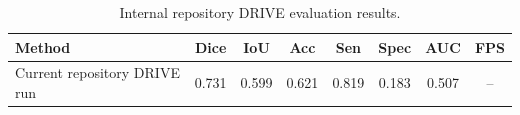 \documentclass{article}
\begin{document}
\begin{table}[H]
\centering
\caption{Internal repository DRIVE evaluation results.}
\label{tab:drive_internal_results}
\begin{tabular}{lccccccc}
\toprule
Method & Dice & IoU & Acc & Sen & Spec & AUC & FPS \\
\midrule
Current repository DRIVE run & 0.731 & 0.599 & 0.621 & 0.819 & 0.183 & 0.507 & -- \\
\bottomrule
\end{tabular}
\end{table}
\end{document}
